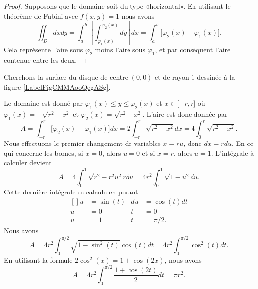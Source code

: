 \begin{proof}
    Supposons que le domaine soit du type «horizontal». En utilisant le théorème de Fubini avec $f(x,y)=1$ nous avons
    \begin{equation}
        \iint_Ddxdy=\int_a^b\left[ \int_{\varphi_1(x)}^{\varphi_2(x)}dy \right]dx=\int_a^b\big[ \varphi_2(x)-\varphi_1(x) \big].
    \end{equation}
    Cela représente l'aire sous $\varphi_2$ moins l'aire sous $\varphi_1$, et par conséquent l'aire contenue entre les deux.
\end{proof}

\begin{example}
    Cherchons la surface du disque de centre $(0,0)$ et de rayon $1$ dessinée à la figure \ref{LabelFigCMMAooQegASg}. %
\newcommand{\CaptionFigCMMAooQegASg}{En bleu, la fonction $\sqrt{r^2-x^2}$ et en rouge, la fonction $-\sqrt{r^2-x^2}$.}


    Le domaine est donné par $\varphi_1(x)\leq y\leq \varphi_2(x)$ et $x\in\mathopen[ -r ,r \mathclose]$ où $\varphi_1(x)=-\sqrt{r^2-x^2}$ et $\varphi_2(x)=\sqrt{r^2-x^2}$. L'aire est donc donnée par
    \begin{equation}
        A=\int_{-r}^r\big[ \varphi_2(x)-\varphi_1(x) \big]dx=2\int_{-r}^r\sqrt{r^2-x^2}dx=4\int_0^r\sqrt{r^2-x^2}.
    \end{equation}
    Nous effectuons le premier changement de variables $x=ru$, donc $dx=rdu$. En ce qui concerne les bornes, si $x=0$, alors $u=0$ et si $x=r$, alors $u=1$. L'intégrale à calculer devient
    \begin{equation}
        A=4\int_0^1\sqrt{r^2-r^2u^2}rdu=4r^2\int_0^1\sqrt{1-u^2}du.
    \end{equation}
    Cette dernière intégrale se calcule en posant
    \begin{equation}
        \begin{aligned}[]
            u&=\sin(t)&du&=\cos(t)dt\\
            u&=0&t&=0\\
            u&=1&t&=\pi/2.
        \end{aligned}
    \end{equation}
    Nous avons
    \begin{equation}
        A=4r^2\int_0^{\pi/2}\sqrt{1-\sin^2(t)}\cos(t)dt=4r^2\int_0^{\pi/2}\cos^2(t)dt.
    \end{equation}
    En utilisant la formule $2\cos^2(x)=1+\cos(2x)$, nous avons
    \begin{equation}
        A=4r^2\int_0^{\pi/2}\frac{ 1+\cos(2t) }{ 2 }dt=\pi r^2.
    \end{equation}
\end{example}

